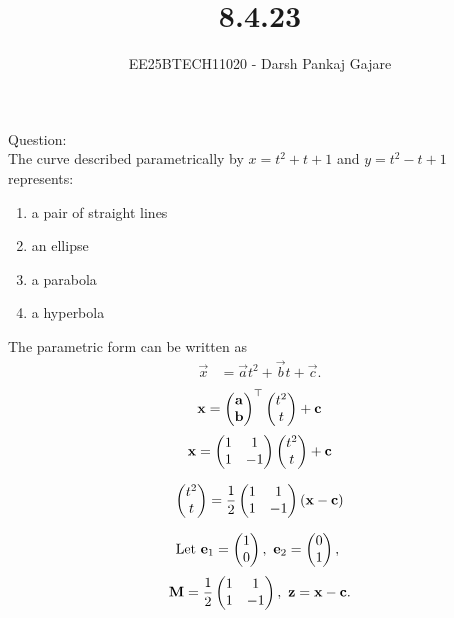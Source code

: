 \documentclass{beamer}
\let\solution\relax
\numberwithin{equation}{section}
\begin{document}
\title{8.4.23}
\author{EE25BTECH11020 - Darsh Pankaj Gajare}
{\let\newpage\relax\maketitle}

Question:\\
The curve described parametrically by $x = t^2 + t + 1$ and $y = t^2 - t + 1$ represents:
\begin{multicols}{2}
	\begin{enumerate}[label=(\Alph*)]
\item a pair of straight lines
\item an ellipse
\item a parabola
\item a hyperbola
\end{enumerate}
\end{multicols}


\solution
\begin{table}[H]
	\centering
	\caption{}
	
	\label{}
\end{table}


The parametric form can be written as
\begin{align}
\vec{x} &= \vec{a}t^2 + \vec{b}t + \vec{c}.
\end{align}
\begin{align}
	\mathbf{x}=\begin{pmatrix}\mathbf{a}\\\mathbf{b}\end{pmatrix}^\top\begin{pmatrix}t^2\\t\end{pmatrix}+\mathbf{c}
\end{align}
\begin{align}
\mathbf{x}=\begin{pmatrix}1 & 1\\ 1 & -1\end{pmatrix}\begin{pmatrix}t^2\\ t\end{pmatrix}+\mathbf{c}
\end{align}

\begin{align}
\begin{pmatrix}t^2\\ t\end{pmatrix}=\frac{1}{2}\begin{pmatrix}1 & 1\\ 1 & -1\end{pmatrix}
\left(\mathbf{x}-\mathbf{c}\right)
\end{align}

\begin{align}
\text{Let } \vec{e}_1=\myvec{1\\ 0},\ \vec{e}_2=\myvec{0\\ 1},\ 
\end{align}
\begin{align}
	\vec{M}=\frac{1}{2}\myvec{1 & 1\\ 1 & -1},\ 
\vec{z}=\vec{x}-\vec{c}. 
\end{align}
\end{document}
